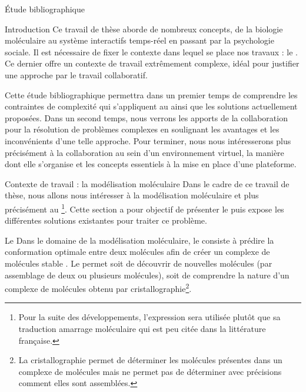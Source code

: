\documentclass[myfrancais,ngerman,english,french]{mythesis}
\begin{document}
	\begin{mychapter}{Étude bibliographique}
		\begin{mysection}{Introduction}
			Ce travail de thèse aborde de nombreux concepts, de la biologie moléculaire au système interactifs temps-réel en passant par la psychologie sociale.
			Il est nécessaire de fixer le contexte dans lequel se place nos travaux : le .
			Ce dernier offre un contexte de travail extrêmement complexe, idéal pour justifier une approche par le travail collaboratif.

			Cette étude bibliographique permettra dans un premier temps de comprendre les contraintes de complexité qui s'appliquent au  ainsi que les solutions actuellement proposées.
			Dans un second temps, nous verrons les apports de la collaboration pour la résolution de problèmes complexes en soulignant les avantages et les inconvénients d'une telle approche.
			Pour terminer, nous nous intéresserons plus précisément à la collaboration au sein d'un environnement virtuel, la manière dont elle s'organise et les concepts essentiels à la mise en place d'une plateforme.
		\end{mysection}
		\begin{mysection}{Contexte de travail : la modélisation moléculaire}
			Dans le cadre de ce travail de thèse, nous allons nous intéresser à la modélisation moléculaire et plus précisément au \footnote{Pour la suite des développements, l'expression \og {} \fg sera utilisée plutôt que sa traduction \og amarrage moléculaire \fg {} qui est peu citée dans la littérature française.}.
			Cette section a pour objectif de présenter le  puis expose les différentes solutions existantes pour traiter ce problème.
			\begin{mysubsection}{Le }
				Dans le domaine de la modélisation moléculaire, le  consiste à prédire la conformation optimale entre deux molécules afin de créer un complexe de molécules stable .
				Le  permet soit de découvrir de nouvelles molécules (par assemblage de deux ou plusieurs molécules), soit de comprendre la nature d'un complexe de molécules obtenu par cristallographie\footnote{La cristallographie permet de déterminer les molécules présentes dans un complexe de molécules mais ne permet pas de déterminer avec précisions comment elles sont assemblées.}.

\end{mysubsection}
\end{mysection}
\end{mychapter}
\end{document}
